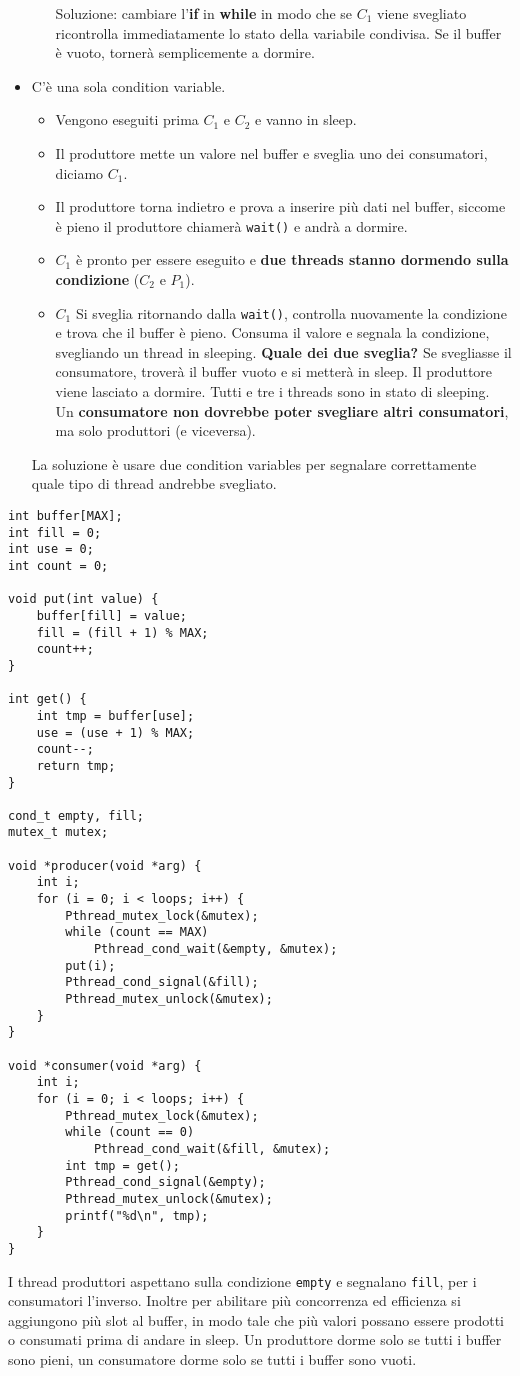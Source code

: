 \documentclass[12pt, twoside, letterpaper]{article}
\begin{document}
\begin{itemize}
\begin{itemize}
						Soluzione: cambiare l'\textbf{if} in \textbf{while} in modo che se $C_1$ viene svegliato ricontrolla immediatamente lo stato della variabile condivisa. Se il buffer è vuoto, tornerà semplicemente a dormire.
					\end{itemize}
					\item C'è una sola condition variable.
					\begin{itemize}
						\item Vengono eseguiti prima $C_1$ e $C_2$ e vanno in sleep.
						\item Il produttore mette un valore nel buffer e sveglia uno dei consumatori, diciamo $C_1$.
						\item Il produttore torna indietro e prova a inserire più dati nel buffer, siccome è pieno il produttore chiamerà \texttt{wait()} e andrà a dormire.
						\item $C_1$ è pronto per essere eseguito e \textbf{due threads stanno dormendo sulla condizione} ($C_2$ e $P_1$).
						\item $C_1$ Si sveglia ritornando dalla \texttt{wait()}, controlla nuovamente la condizione e trova che il buffer è pieno. Consuma il valore e segnala la condizione, svegliando un thread in sleeping. \textbf{Quale dei due sveglia?} Se svegliasse il consumatore, troverà il buffer vuoto e si metterà in sleep. Il produttore viene lasciato a dormire. Tutti e tre i threads sono in stato di sleeping. Un \textbf{consumatore non dovrebbe poter svegliare altri consumatori}, ma solo produttori (e viceversa).
					\end{itemize}
					La soluzione è usare due condition variables per segnalare correttamente quale tipo di thread andrebbe svegliato.
				\end{itemize}
				\begin{lstlisting}[style=CStyle]
int buffer[MAX];
int fill = 0;
int use = 0;
int count = 0;

void put(int value) {
	buffer[fill] = value;
	fill = (fill + 1) % MAX;
	count++;
}

int get() {
	int tmp = buffer[use];
	use = (use + 1) % MAX;
	count--;
	return tmp;
}

cond_t empty, fill;
mutex_t mutex;

void *producer(void *arg) {
	int i;
	for (i = 0; i < loops; i++) {
		Pthread_mutex_lock(&mutex);	
		while (count == MAX)
			Pthread_cond_wait(&empty, &mutex); 
		put(i);
		Pthread_cond_signal(&fill);
		Pthread_mutex_unlock(&mutex);
	}
}

void *consumer(void *arg) {
	int i;
	for (i = 0; i < loops; i++) {
		Pthread_mutex_lock(&mutex);
		while (count == 0)
			Pthread_cond_wait(&fill, &mutex);
		int tmp = get();
		Pthread_cond_signal(&empty);
		Pthread_mutex_unlock(&mutex);
		printf("%d\n", tmp);
	}
}				\end{lstlisting}
				I thread produttori aspettano sulla condizione \texttt{empty} e segnalano \texttt{fill}, per i consumatori l'inverso. Inoltre per abilitare più concorrenza ed efficienza si aggiungono più slot al buffer, in modo tale che più valori possano essere prodotti o consumati prima di andare in sleep. Un produttore dorme solo se tutti i buffer sono pieni, un consumatore dorme solo se tutti i buffer sono vuoti.
\end{document}
